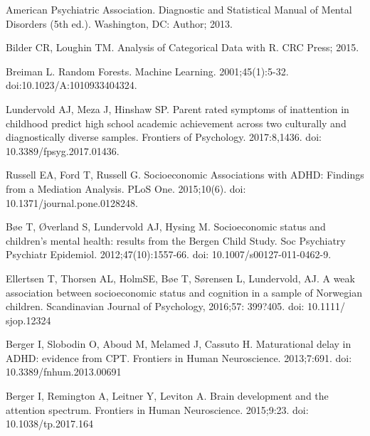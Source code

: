 \documentclass[10pt,letterpaper]{article}
\begin{document}
{\begin{thebibliography}{vancouver.bst}

American Psychiatric Association. 
\newblock Diagnostic and Statistical Manual of Mental
Disorders (5th ed.). 
\newblock Washington, DC: Author; 2013.

Bilder CR,  Loughin TM.
\newblock Analysis of Categorical Data with R.
\newblock CRC Press; 2015.


Breiman L.
\newblock Random Forests. 
\newblock Machine Learning. 2001;45(1):5-32. doi:10.1023/A:1010933404324.




Lundervold  AJ, Meza J, Hinshaw SP.
\newblock Parent rated symptoms of inattention in childhood predict high school academic achievement across two culturally and diagnostically diverse samples.
\newblock Frontiers of Psychology. 2017:8,1436. doi: 10.3389/fpsyg.2017.01436.


Russell EA, Ford T, Russell G.
\newblock Socioeconomic Associations with ADHD: Findings from a Mediation Analysis.
\newblock PLoS One. 2015;10(6). doi: 10.1371/journal.pone.0128248. 


B\o{}e T, \O{}verland S, Lundervold AJ, Hysing M.
\newblock Socioeconomic status and children's mental health: results from the Bergen Child Study.
\newblock Soc Psychiatry Psychiatr Epidemiol. 2012;47(10):1557-66. doi: 10.1007/s00127-011-0462-9. 


Ellertsen T, Thorsen AL, HolmSE, B\o{}e T, S\o{}rensen L, Lundervold,
AJ.
\newblock A weak association between socioeconomic status and cognition
in a sample of Norwegian children. 
\newblock Scandinavian Journal of Psychology, 2016;57: 399?405. doi: 10.1111/
sjop.12324
  

Berger I, Slobodin O, Aboud M, Melamed J, Cassuto H.
\newblock Maturational delay in {ADHD}: evidence from {CPT}.
\newblock Frontiers in Human Neuroscience. 2013;7:691. doi: 10.3389/fnhum.2013.00691


Berger I, Remington A, Leitner Y, Leviton A.
\newblock Brain development and the attention spectrum.
\newblock Frontiers in Human Neuroscience. 2015;9:23. doi: 10.1038/tp.2017.164



\end{thebibliography}}
\end{document}
